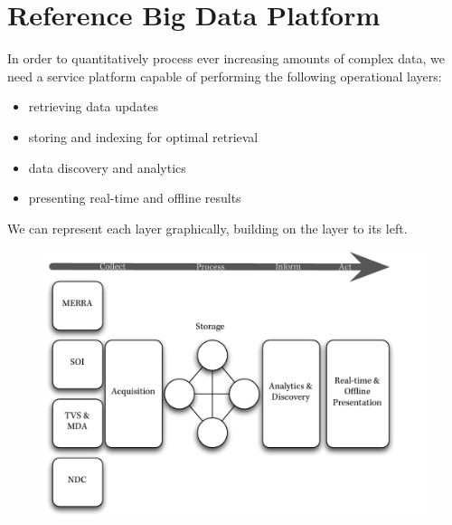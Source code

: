 \section{Reference Big Data Platform}
In order to quantitatively process ever increasing amounts of complex data, we need a service platform capable of performing the following operational layers:
\begin{itemize}
	\item retrieving data updates
	\item storing and indexing for optimal retrieval
	\item data discovery and analytics
	\item presenting real-time and offline results
\end{itemize}
We can represent each layer graphically, building on the layer to its left. 
\begin{figure}[htp]
    \centering
    \includegraphics[scale=.75]{dataflow}
\end{figure}

